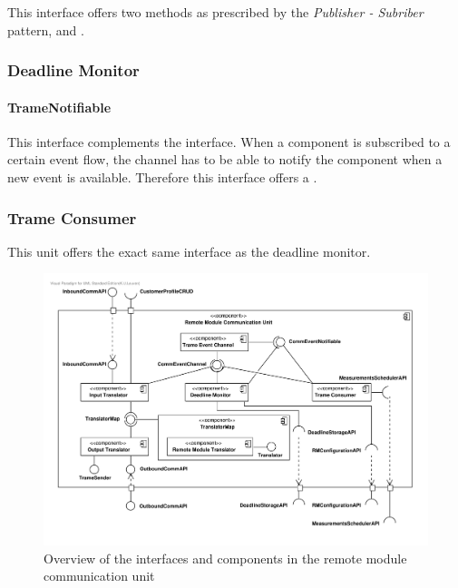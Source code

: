 \npar This interface offers two methods as prescribed by the \emph{Publisher -
Subriber} pattern,  and
.

\subsubsection{Deadline Monitor}

\paragraph{TrameNotifiable}

\npar This interface complements the  interface. When a
component is subscribed to a certain event flow, the channel has to be able to
notify the component when a new event is available. Therefore this interface
offers a .

\subsubsection{Trame Consumer}

\npar This unit offers the exact same interface as the deadline monitor.


\begin{figure}[H]
	\begin{centering}
		\includegraphics[width=\textwidth]{figs/add-it2-interfaces.pdf}
		\caption{Overview of the interfaces and components in the remote
		module communication unit}
		\label{fig:it2/interfaces}
	\end{centering}
\end{figure}

